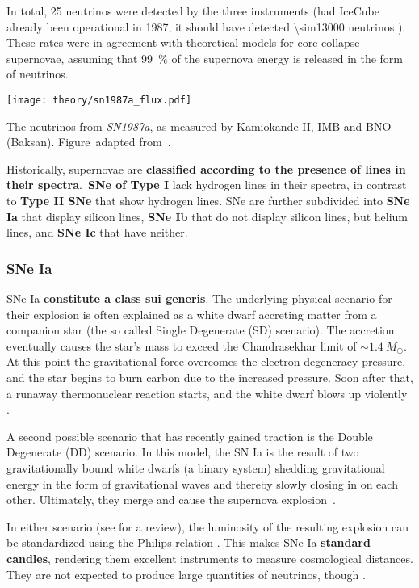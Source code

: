 In total, 25 neutrinos were detected by the three instruments (had IceCube already been operational in 1987, it should have detected \num{\sim13000} neutrinos ). These rates were in agreement with theoretical models for core-collapse supernovae, assuming that \SI{99}{\percent} of the supernova energy is released in the form of neutrinos.

\begin{marginfigure}
    \texttt{[image: theory/sn1987a\_flux.pdf]}
    \caption[Neutrinos from \emph{SN1987a}]{The neutrinos from \emph{SN1987a}, as measured by Kamiokande-II, IMB and BNO (Baksan). Figure\ adapted from~\cite{Grupen2005}.}
\end{marginfigure}

Historically, supernovae are \textbf{classified according to the presence of lines in their spectra}.\ \textbf{SNe of Type I} lack hydrogen lines in their spectra, in contrast to \textbf{Type II SNe} that show hydrogen lines. SNe are further subdivided into \textbf{SNe Ia} that display silicon lines, \textbf{SNe Ib} that do not display silicon lines, but helium lines, and \textbf{SNe Ic} that have neither.

\subsubsection{SNe Ia}\label{sne_ia}
SNe Ia \textbf{constitute a class sui generis}. The underlying physical scenario for their explosion is often explained as a white dwarf accreting matter from a companion star (the so called Single Degenerate (SD) scenario). The accretion eventually causes the star's mass to exceed the Chandrasekhar limit of $\sim1.4~M_\odot$. At this point the gravitational force overcomes the electron degeneracy pressure, and the star begins to burn carbon due to the increased pressure. Soon after that, a runaway thermonuclear reaction starts, and the white dwarf blows up violently .

A second possible scenario that has recently gained traction is the Double Degenerate (DD) scenario. In this model, the SN Ia is the result of two gravitationally bound white dwarfs (a binary system) shedding gravitational energy in the form of gravitational waves and thereby slowly closing in on each other. Ultimately, they merge and cause the supernova explosion~\cite{Iben1984}.

In either scenario (see  for a review), the luminosity of the resulting explosion can be standardized using the Philips relation . This makes SNe Ia \textbf{standard candles}, rendering them excellent instruments to measure cosmological distances. They are not expected to produce large quantities of neutrinos, though .

